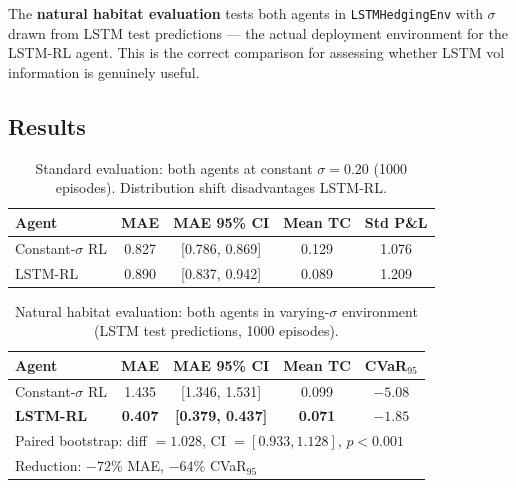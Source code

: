 \documentclass[12pt,a4paper]{article}
\begin{document}
The \textbf{natural habitat evaluation} tests both agents in
\texttt{LSTMHedgingEnv} with $\sigma$ drawn from LSTM test predictions ---
the actual deployment environment for the LSTM-RL agent.  This is the correct
comparison for assessing whether LSTM vol information is genuinely useful.

\subsection{Results}

\begin{table}[H]
  \centering
  \caption{Standard evaluation: both agents at constant $\sigma=0.20$
           (1000 episodes). Distribution shift disadvantages LSTM-RL.}
  \label{tab:int_standard}
  \begin{tabular}{lcccc}
    \toprule
    Agent & MAE & MAE 95\% CI & Mean TC & Std P\&L \\
    \midrule
    Constant-$\sigma$ RL & 0.827 & [0.786, 0.869] & 0.129 & 1.076 \\
    LSTM-RL              & 0.890 & [0.837, 0.942] & 0.089 & 1.209 \\
    \bottomrule
  \end{tabular}
\end{table}

\begin{table}[H]
  \centering
  \caption{Natural habitat evaluation: both agents in varying-$\sigma$
           environment (LSTM test predictions, 1000 episodes).}
  \label{tab:int_natural}
  \begin{tabular}{lcccc}
    \toprule
    Agent & MAE & MAE 95\% CI & Mean TC & CVaR$_{95}$ \\
    \midrule
    Constant-$\sigma$ RL & 1.435 & [1.346, 1.531] & 0.099 & $-5.08$ \\
    \textbf{LSTM-RL}     & \textbf{0.407} & \textbf{[0.379, 0.437]} & \textbf{0.071} & \textbf{$-1.85$} \\
    \midrule
    \multicolumn{5}{l}{Paired bootstrap: diff $= 1.028$,
      CI $= [0.933, 1.128]$, $p < 0.001$}\\
    \multicolumn{5}{l}{Reduction: $-72\%$ MAE, $-64\%$ CVaR$_{95}$} \\
    \bottomrule
  \end{tabular}
\end{table}
\end{document}
